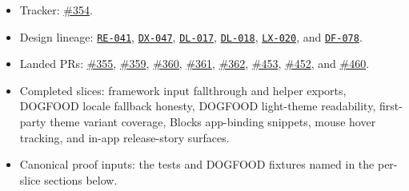 \begin{itemize}
\tightlist
\item
  Tracker: \href{https://github.com/flyingrobots/bijou/issues/354}{\#354}.
\item
  Design lineage: \href{https://github.com/flyingrobots/bijou/blob/cbd70612140e7a450d764b3c7be1c6af878b99bc/docs/design/RE-041-v72-framework-input-stabilization.md}{\texttt{R\allowbreak{}E\allowbreak{}-\allowbreak{}0\allowbreak{}4\allowbreak{}1}}, \href{https://github.com/flyingrobots/bijou/blob/cbd70612140e7a450d764b3c7be1c6af878b99bc/docs/design/DX-047-blocks-app-binding-snippets.md}{\texttt{D\allowbreak{}X\allowbreak{}-\allowbreak{}0\allowbreak{}4\allowbreak{}7}}, \href{https://github.com/flyingrobots/bijou/blob/cbd70612140e7a450d764b3c7be1c6af878b99bc/docs/design/DL-017-dogfood-light-theme-readiness.md}{\texttt{D\allowbreak{}L\allowbreak{}-\allowbreak{}0\allowbreak{}1\allowbreak{}7}}, \href{https://github.com/flyingrobots/bijou/blob/cbd70612140e7a450d764b3c7be1c6af878b99bc/docs/design/DL-018-first-party-theme-variant-coverage.md}{\texttt{D\allowbreak{}L\allowbreak{}-\allowbreak{}0\allowbreak{}1\allowbreak{}8}}, \href{https://github.com/flyingrobots/bijou/blob/cbd70612140e7a450d764b3c7be1c6af878b99bc/docs/design/LX-020-dogfood-locale-demo-readiness.md}{\texttt{L\allowbreak{}X\allowbreak{}-\allowbreak{}0\allowbreak{}2\allowbreak{}0}}, and \href{https://github.com/flyingrobots/bijou/blob/cbd70612140e7a450d764b3c7be1c6af878b99bc/docs/design/DF-078-dogfood-release-story-surfaces.md}{\texttt{D\allowbreak{}F\allowbreak{}-\allowbreak{}0\allowbreak{}7\allowbreak{}8}}.
\item
  Landed PRs: \href{https://github.com/flyingrobots/bijou/pull/355}{\#355}, \href{https://github.com/flyingrobots/bijou/pull/359}{\#359}, \href{https://github.com/flyingrobots/bijou/pull/360}{\#360}, \href{https://github.com/flyingrobots/bijou/pull/361}{\#361}, \href{https://github.com/flyingrobots/bijou/pull/362}{\#362}, \href{https://github.com/flyingrobots/bijou/pull/453}{\#453}, \href{https://github.com/flyingrobots/bijou/pull/452}{\#452}, and \href{https://github.com/flyingrobots/bijou/pull/460}{\#460}.
\item
  Completed slices: framework input fallthrough and helper exports, DOGFOOD locale fallback honesty, DOGFOOD light-theme readability, first-party theme variant coverage, Blocks app-binding snippets, mouse hover tracking, and in-app release-story surfaces.
\item
  Canonical proof inputs: the tests and DOGFOOD fixtures named in the per-slice sections below.

\end{itemize}
